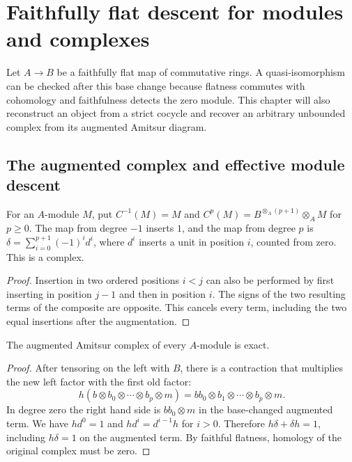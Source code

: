 \chapter{Faithfully flat descent for modules and complexes}
\label{ch:flat-descent}

Let \(A\to B\) be a faithfully flat map of commutative rings. A
quasi-isomorphism can be checked after this base change because flatness
commutes with cohomology and faithfulness detects the zero module. This
chapter will also reconstruct an object from a strict cocycle and recover
an arbitrary unbounded complex from its augmented Amitsur diagram.

\section{The augmented complex and effective module descent}

\begin{definition}\label{res:F01}
For an \(A\)-module \(M\), put \(C^{-1}(M)=M\) and
\(C^p(M)=B^{\otimes_A(p+1)}\otimes_A M\) for \(p\geq0\). The
map from degree \(-1\) inserts \(1\), and the map from degree \(p\)
is \(\delta=\sum_{i=0}^{p+1}(-1)^id^i\), where \(d^i\) inserts a
unit in position \(i\), counted from zero. This is a complex.
\end{definition}
\begin{proof}
Insertion in two ordered positions \(i<j\) can also be performed by
first inserting in position \(j-1\) and then in position \(i\).
The signs of the two resulting terms of the composite are opposite.
This cancels every term, including the two equal insertions after the
augmentation.
\end{proof}

\begin{theorem}\label{res:F02}
The augmented Amitsur complex of every \(A\)-module is exact.
\end{theorem}
\begin{proof}
After tensoring on the left with \(B\), there is a contraction that
multiplies the new left factor with the first old factor:
\[
 h(b\otimes b_0\otimes\cdots\otimes b_p\otimes m)
   =bb_0\otimes b_1\otimes\cdots\otimes b_p\otimes m .
\]
In degree zero the right hand side is \(bb_0\otimes m\) in the
base-changed augmented term. We have \(hd^0=1\) and
\(hd^i=d^{i-1}h\) for \(i>0\). Therefore
\(h\delta+\delta h=1\), including \(h\delta=1\) on the augmented
term. By faithful flatness, homology of the original complex
must be zero.
\end{proof}


